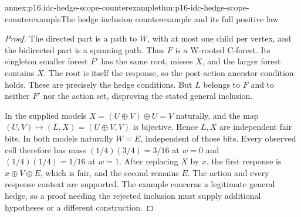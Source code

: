 \begin{annexitem}{annex:p16.idc-hedge-scope-counterexample}{thm:p16-idc-hedge-scope-counterexample}{The hedge inclusion counterexample and its full positive law}
\begin{proof}
The directed part is a path to \(W\), with at most one
child per vertex, and the bidirected part is a spanning path.
Thus \(F\) is a W-rooted C-forest. Its singleton smaller
forest \(F'\) has the same root, misses \(X\), and the
larger forest contains \(X\). The root is itself the response,
so the post-action ancestor condition holds. These are precisely
the hedge conditions. But \(L\) belongs to \(F\) and
to neither \(F'\) nor the action set, disproving the stated
general inclusion.

In the supplied models \(X=(U\oplus V)\oplus U=V\)
naturally, and the map \((U,V)\mapsto(L,X)=(U\oplus V,V)\)
is bijective. Hence \(L,X\) are independent fair bits.
In both models naturally \(W=E\), independent of those
bits. Every observed cell therefore has mass \((1/4)(3/4)=3/16\)
at \(w=0\) and \((1/4)(1/4)=1/16\) at \(w=1\).
After replacing \(X\) by \(x\), the first response is
\(x\oplus V\oplus E\), which is fair, and the second
remains \(E\). The action and every response context are
supported. The example concerns a legitimate general hedge,
so a proof needing the rejected inclusion must supply additional
hypotheses or a different construction.
\end{proof}
\end{annexitem}

